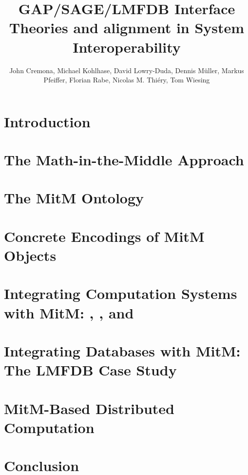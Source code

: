 \documentclass[book]{deliverablereport}
\title{GAP/SAGE/LMFDB Interface Theories and alignment in \ommtfor System Interoperability}
\author{John Cremona, Michael Kohlhase, David Lowry-Duda, Dennis M\"uller, Markus Pfeiffer, Florian Rabe, Nicolas M. Thiéry, Tom Wiesing}
\begin{document}
\begin{abstract}\end{abstract}
\maketitle
\setcounter{tocdepth}{2}
\newpage\tableofcontents\newpage

\section{Introduction}\label{sec:intro}
\newpage

\section[Math-in-the-Middle]{The Math-in-the-Middle Approach}\label{sec:mitm}
\newpage

\section[MitM Ontology]{The MitM Ontology}\label{sec:cgt}
\newpage

\section{Concrete Encodings of MitM Objects}\label{sec:codecs}
\newpage

\section[Computation Systems]{Integrating Computation Systems with MitM: \GAP, \Sage, and \Singular}\label{sec:apit}
\newpage

\section[Databases]{Integrating Databases with MitM: The LMFDB Case Study}\label{sec:databases}
\newpage
\section[Distributed Computation]{MitM-Based Distributed Computation}\label{sec:case}
\newpage

\section{Conclusion}\label{sec:concl}


\printbibliography
\end{document}
